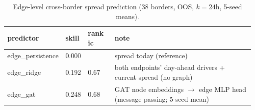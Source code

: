 \begin{table}[htbp]
  \centering
  \small
  \caption{Edge-level cross-border spread prediction (38 borders, OOS, $k=24$h, 5-seed means).}
  \label{tab:energy-edge-skill}
  \begin{tabular}{lll>{\raggedright\arraybackslash}p{}}
    \toprule
    predictor & skill & rank ic & note \\
    \midrule
    edge\_persistence & 0.000 &  & spread today (reference) \\
    edge\_ridge & 0.192 & 0.67 & both endpoints' day-ahead drivers + current spread (no graph) \\
    edge\_gat & 0.248 & 0.68 & GAT node embeddings $\to$ edge MLP head (message passing; 5-seed mean) \\
    \bottomrule
  \end{tabular}
\end{table}
